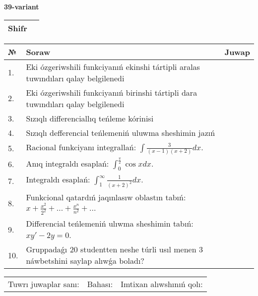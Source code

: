\documentclass{article}
\begin{document}
  \egroup
  
  \newpage
  
  
  \textbf{39-variant}\\
  
  \bgroup
  \def\arraystretch{1.6} %
  
  \begin{tabular}{|m{5.7cm}|m{9.5cm}|}
  \hline
  Shifr & \\
  \hline
  \end{tabular}
  
  \vspace{1cm}
  
  \begin{tabular}{|m{0.7cm}|m{10cm}|m{4cm}|}
  \hline
  № & Soraw & Juwap \\
  \hline
  1. & Eki ózgeriwshili funkciyanıń ekinshi tártipli aralas tuwındıları qalay belgilenedi &  \\
  \hline
  2. & Eki ózgeriwshili funkciyanıń birinshi tártipli dara tuwındıları qalay belgilenedi &  \\
  \hline
  3. & Sızıqlı differenciallıq teńleme kórinisi &  \\
  \hline
  4. & Sızıqlı defferencial teńlemeniń uluwma sheshimin jazıń &  \\
  \hline
  5. & Racional funkciyanı integrallań: \(\int{\frac{3}{(x - 1)(x + 2)}dx}\). &  \\
  \hline
  6. & Anıq integraldı esaplań: \(\int_{0}^{\frac{\pi}{2}}{\cos xdx}\). &  \\
  \hline
  7. & Integraldı esaplań: \(\int_{1}^{\infty}{\frac{1}{(x + 2)^2 }dx}\). &  \\
  \hline
  8. & Funkcional qatardıń jaqınlasıw oblastın tabıń: \(x + \frac{x^2 }{2^2 } + ... + \frac{x^{n}}{n^2 } + ...\) &  \\
  \hline
  9. & Differencial teńlemeniń ulıwma sheshimin tabıń: \(xy' - 2y = 0\). &  \\
  \hline
  10. & Gruppadaǵı 20 studentten neshe túrli usıl menen 3 náwbetshini saylap alıwǵa boladı? &  \\
  \hline
  \end{tabular}
  
  \vspace{1cm}
  
  \begin{tabular}{lll}
  Tuwrı juwaplar sanı: \underline{\hspace{1.5cm}} & 
  Bahası: \underline{\hspace{1.5cm}} & 
  Imtixan alıwshınıń qolı: \underline{\hspace{2cm}} \\
  \end{tabular}
  
\end{document}
